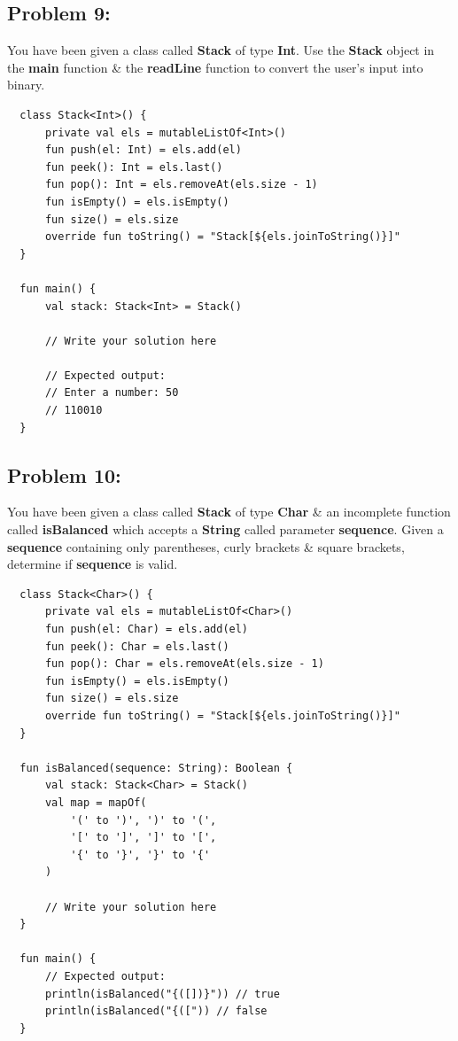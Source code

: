 \documentclass{article}
\begin{document}
\subsection*{Problem 9:}
You have been given a class called \textbf{Stack} of type \textbf{Int}. Use the \textbf{Stack} object in the \textbf{main} function \& the \textbf{readLine} function to convert the user's input into binary. 

\begin{verbatim}
  class Stack<Int>() {
      private val els = mutableListOf<Int>()
      fun push(el: Int) = els.add(el)
      fun peek(): Int = els.last()
      fun pop(): Int = els.removeAt(els.size - 1)
      fun isEmpty() = els.isEmpty()
      fun size() = els.size
      override fun toString() = "Stack[${els.joinToString()}]"
  }

  fun main() {
      val stack: Stack<Int> = Stack()

      // Write your solution here

      // Expected output:
      // Enter a number: 50
      // 110010
  }
\end{verbatim}

\subsection*{Problem 10:}
You have been given a class called \textbf{Stack} of type \textbf{Char} \& an incomplete function called \textbf{isBalanced} which accepts a \textbf{String} called parameter \textbf{sequence}. Given a \textbf{sequence} containing only parentheses, curly brackets \& square brackets, determine if \textbf{sequence} is valid.

\begin{verbatim}
  class Stack<Char>() {
      private val els = mutableListOf<Char>()
      fun push(el: Char) = els.add(el)
      fun peek(): Char = els.last()
      fun pop(): Char = els.removeAt(els.size - 1)
      fun isEmpty() = els.isEmpty()
      fun size() = els.size
      override fun toString() = "Stack[${els.joinToString()}]"
  }

  fun isBalanced(sequence: String): Boolean {
      val stack: Stack<Char> = Stack()
      val map = mapOf(
          '(' to ')', ')' to '(',
          '[' to ']', ']' to '[',
          '{' to '}', '}' to '{'
      )
      
      // Write your solution here
  }

  fun main() {
      // Expected output:
      println(isBalanced("{([])}")) // true
      println(isBalanced("{([")) // false
  }
\end{verbatim}
\end{document}

